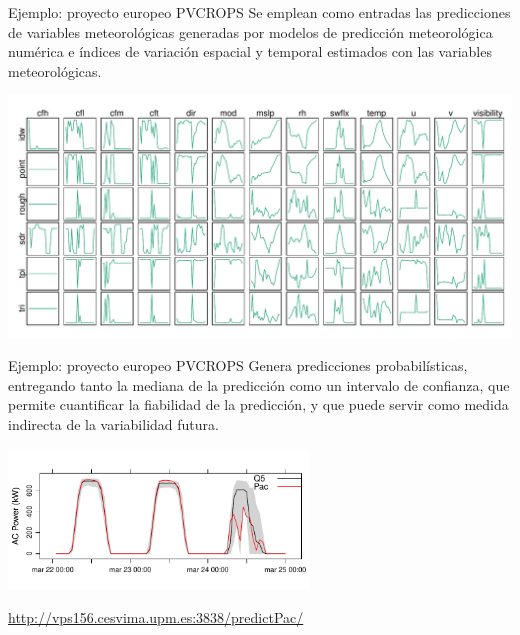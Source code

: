 \documentclass[aspectratio=169, usenames,svgnames,dvipsnames]{beamer}
\begin{document}
\begin{frame}[label={sec:orgb3e4eab}]{Ejemplo: proyecto europeo PVCROPS}
Se emplean como entradas las predicciones de \alert{variables
meteorológicas} generadas por modelos de predicción meteorológica
numérica e \alert{índices de variación espacial y temporal} estimados con
las variables meteorológicas.

\begin{center}
\includegraphics[height=0.7\textheight]{../figs/varsComplete.pdf}
\end{center}
\end{frame}


\begin{frame}[label={sec:org3c59c43}]{Ejemplo: proyecto europeo PVCROPS}
Genera \alert{predicciones probabilísticas}, entregando tanto la mediana de la
predicción como un intervalo de confianza, que permite cuantificar la
fiabilidad de la predicción, y que puede servir como medida indirecta
de la variabilidad futura.

\begin{center}
\includegraphics[width=0.6\textwidth]{../figs/powerResult.pdf}
\end{center}

\begin{center}
\url{http://vps156.cesvima.upm.es:3838/predictPac/}
\end{center}
\end{frame}
\end{document}
